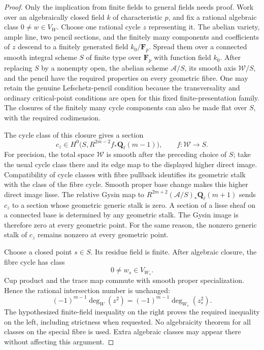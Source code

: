 \begin{proof}
Only the implication from finite fields to general fields needs
proof. Work over an algebraically closed field $k$ of
characteristic $p$, and fix a rational algebraic class
$0\ne w\in V_W$. Choose one rational cycle $z$ representing it.
The abelian variety, ample line, two pencil sections, and the
finitely many components and coefficients of $z$ descend to
a finitely generated field $k_0/\mathbf F_p$.
Spread them over a connected smooth integral scheme $S$ of
finite type over $\mathbf F_p$ with function field $k_0$.
After replacing $S$ by a nonempty open, the abelian scheme
$\mathscr A/S$, its smooth axis $\mathscr W/S$, and the pencil
have the required properties on every geometric fibre.
One may retain the genuine Lefschetz-pencil condition because
the transversality and ordinary critical-point conditions are
open for this fixed finite-presentation family. The closures
of the finitely many cycle components can also be made flat
over $S$, with the required codimension.

The cycle class of this closure gives a section
\[
 c_z\in H^0\bigl(S,R^{2m-2}f_*\mathbf Q_\ell(m-1)\bigr),
          \qquad f:\mathscr W\longrightarrow S.
                                                        \tag{H9.8b.2}
\]
For precision, the total space $\mathscr W$ is smooth after
the preceding choice of $S$; take the usual cycle class there
and its edge map to the displayed higher direct image.
Compatibility of cycle classes with fibre pullback identifies
its geometric stalk with the class of the fibre cycle.
Smooth proper base change makes this higher direct image
lisse. The relative Gysin map to
$R^{2m+2}(\mathscr A/S)_*\mathbf Q_\ell(m+1)$ sends $c_z$
to a section whose geometric generic stalk is zero. A section
of a lisse sheaf on a connected base is determined by any
geometric stalk. The Gysin image is therefore zero at every
geometric point. For the same reason, the nonzero generic
stalk of $c_z$ remains nonzero at every geometric point.

Choose a closed point $s\in S$. Its residue field is finite.
After algebraic closure, the fibre cycle has class
\[
                    0\ne w_s\in V_{W_s}.
                                                        \tag{H9.8b.3}
\]
Cup product and the trace map commute with smooth proper
specialization. Hence the rational intersection number is
unchanged:
\[
                  (-1)^{m-1}\deg_W(z^2)
                    =(-1)^{m-1}\deg_{W_s}(z_s^2).
                                                        \tag{H9.8b.4}
\]
The hypothesized finite-field inequality on the right proves
the required inequality on the left, including strictness
when requested. No algebraicity theorem for all classes on
the special fibre is used. Extra algebraic classes may appear
there without affecting this argument.


\end{proof}
